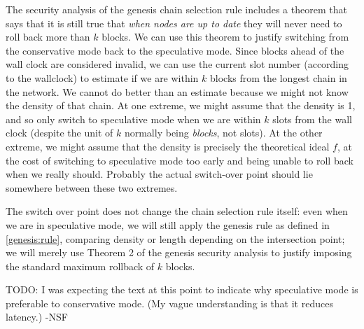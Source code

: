 The security analysis of the genesis chain selection rule includes a theorem
\cite[Theorem 2]{cryptoeprint:2018:378} that says that it is still true that
\emph{when nodes are up to date} they will never need to roll back more than $k$
blocks. We can use this theorem to justify switching from the conservative
mode back to the speculative mode. Since blocks ahead of the wall clock are
considered invalid, we can use the current slot number (according to the
wallclock) to estimate if we are within $k$ blocks from the longest chain
in the network. We cannot do better than an estimate because we might not know
the density of that chain. At one extreme, we might assume that the density is
1, and so only switch to speculative mode when we are within $k$ slots from the
wall clock (despite the unit of $k$ normally being \emph{blocks}, not slots). At
the other extreme, we might assume that the density is precisely the theoretical
ideal $f$, at the cost of switching to speculative mode too early and being
unable to roll back when we really should. Probably the actual switch-over point
should lie somewhere between these two extremes.

The switch over point does not change the chain selection rule itself: even when
we are in speculative mode, we will still apply the genesis rule as defined in
\cref{genesis:rule}, comparing density or length depending on the intersection
point; we will merely use Theorem 2 of the genesis security analysis to justify
imposing the standard maximum rollback of $k$ blocks.

 TODO: I was expecting the text at this point to indicate why
speculative mode is preferable to conservative mode. (My vague understanding is
that it reduces latency.) -NSF

